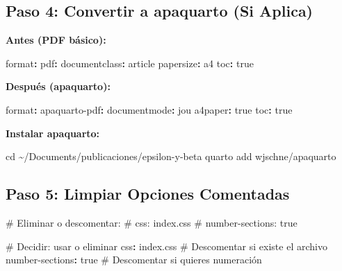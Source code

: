 \documentclass[
  doc,
  floatsintext,
  longtable,
  a4paper,
  nolmodern,
  notxfonts,
  notimes,
  12pt,
  colorlinks=true,linkcolor=blue,citecolor=blue,urlcolor=blue]{apa7}
\newenvironment{Shaded}{\begin{snugshade}}{\end{snugshade}}
\newcommand{\AttributeTok}[1]{\textcolor[rgb]{0.40,0.45,0.13}{#1}}
\newcommand{\BuiltInTok}[1]{\textcolor[rgb]{0.00,0.23,0.31}{#1}}
\newcommand{\CharTok}[1]{\textcolor[rgb]{0.13,0.47,0.30}{#1}}
\newcommand{\CommentTok}[1]{\textcolor[rgb]{0.37,0.37,0.37}{#1}}
\newcommand{\ExtensionTok}[1]{\textcolor[rgb]{0.00,0.23,0.31}{#1}}
\newcommand{\FunctionTok}[1]{\textcolor[rgb]{0.28,0.35,0.67}{#1}}
\newcommand{\KeywordTok}[1]{\textcolor[rgb]{0.00,0.23,0.31}{\textbf{#1}}}
\newcommand{\NormalTok}[1]{\textcolor[rgb]{0.00,0.23,0.31}{#1}}
\begin{document}
\subsection{Paso 4: Convertir a apaquarto (Si
Aplica)}\label{paso-4-convertir-a-apaquarto-si-aplica}

\textbf{Antes (PDF básico):}

\begin{Shaded}
\begin{Highlighting}[]
\FunctionTok{format}\KeywordTok{:}
\AttributeTok{  }\FunctionTok{pdf}\KeywordTok{:}
\AttributeTok{    }\FunctionTok{documentclass}\KeywordTok{:}\AttributeTok{ article}
\AttributeTok{    }\FunctionTok{papersize}\KeywordTok{:}\AttributeTok{ a4}
\AttributeTok{    }\FunctionTok{toc}\KeywordTok{:}\AttributeTok{ }\CharTok{true}
\end{Highlighting}
\end{Shaded}

\textbf{Después (apaquarto):}

\begin{Shaded}
\begin{Highlighting}[]
\FunctionTok{format}\KeywordTok{:}
\AttributeTok{  }\FunctionTok{apaquarto{-}pdf}\KeywordTok{:}
\AttributeTok{    }\FunctionTok{documentmode}\KeywordTok{:}\AttributeTok{ jou}
\AttributeTok{    }\FunctionTok{a4paper}\KeywordTok{:}\AttributeTok{ }\CharTok{true}
\AttributeTok{    }\FunctionTok{toc}\KeywordTok{:}\AttributeTok{ }\CharTok{true}
\end{Highlighting}
\end{Shaded}

\textbf{Instalar apaquarto:}

\begin{Shaded}
\begin{Highlighting}[]
\BuiltInTok{cd}\NormalTok{ \textasciitilde{}/Documents/publicaciones/epsilon{-}y{-}beta}
\ExtensionTok{quarto}\NormalTok{ add wjschne/apaquarto}
\end{Highlighting}
\end{Shaded}

\subsection{Paso 5: Limpiar Opciones
Comentadas}\label{paso-5-limpiar-opciones-comentadas}

\begin{Shaded}
\begin{Highlighting}[]
\CommentTok{\#  Eliminar o descomentar:}
\CommentTok{\# css: index.css}
\CommentTok{\# number{-}sections: true}

\CommentTok{\# Decidir: usar o eliminar}
\FunctionTok{css}\KeywordTok{:}\AttributeTok{ index.css}\CommentTok{                \# Descomentar si existe el archivo}
\FunctionTok{number{-}sections}\KeywordTok{:}\AttributeTok{ }\CharTok{true}\CommentTok{         \# Descomentar si quieres numeración}
\end{Highlighting}
\end{Shaded}
\end{document}
